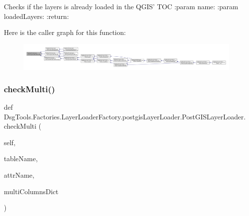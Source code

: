 \begin{DoxyVerb}Checks if the layers is already loaded in the QGIS' TOC
:param name:
:param loadedLayers:
:return:
\end{DoxyVerb}
 Here is the caller graph for this function\+:
\nopagebreak
\begin{figure}[H]
\begin{center}
\leavevmode
\includegraphics[width=350pt]{class_dsg_tools_1_1_factories_1_1_layer_loader_factory_1_1postgis_layer_loader_1_1_post_g_i_s_layer_loader_a94bf18cb533d9b774d8dd5ea0825fed8_icgraph}
\end{center}
\end{figure}
\mbox{\label{class_dsg_tools_1_1_factories_1_1_layer_loader_factory_1_1postgis_layer_loader_1_1_post_g_i_s_layer_loader_ab900892c310136c038574363524b98c0}} 
\subsubsection{\texorpdfstring{check\+Multi()}{checkMulti()}}
{\footnotesize\ttfamily def Dsg\+Tools.\+Factories.\+Layer\+Loader\+Factory.\+postgis\+Layer\+Loader.\+Post\+G\+I\+S\+Layer\+Loader.\+check\+Multi (\begin{DoxyParamCaption}\item[{}]{self,  }\item[{}]{table\+Name,  }\item[{}]{attr\+Name,  }\item[{}]{multi\+Columns\+Dict }\end{DoxyParamCaption})}

